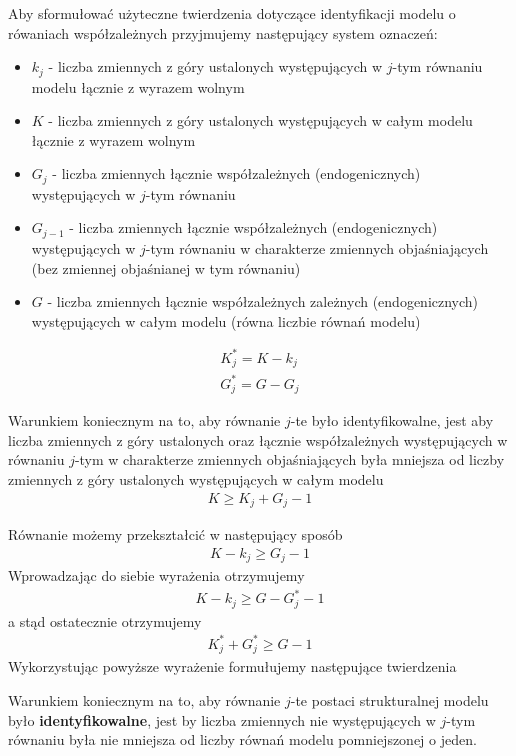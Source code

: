Aby sformułować użyteczne twierdzenia dotyczące identyfikacji modelu o rówaniach współzależnych przyjmujemy następujący system oznaczeń:
\begin{itemize}
	\item $ k_j $ - liczba zmiennych z góry ustalonych występujących w $ j $-tym równaniu modelu łącznie z wyrazem wolnym
	\item $ K $ - liczba zmiennych z góry ustalonych występujących w całym modelu łącznie z wyrazem wolnym
	\item $ G_j $ - liczba zmiennych łącznie współzależnych (endogenicznych) występujących w $ j $-tym równaniu
	\item $ G_{j-1} $ - liczba zmiennych łącznie współzależnych (endogenicznych) występujących w $ j $-tym równaniu w charakterze zmiennych objaśniających (bez zmiennej objaśnianej w tym równaniu)
	\item $ G $ - liczba zmiennych łącznie współzależnych zależnych (endogenicznych) występujących w całym modelu (równa liczbie równań modelu)
\end{itemize}
\begin{gather*}
K_j^*=K-k_j\\
G_j^*=G-G_j
\end{gather*}
\begin{twr}
	Warunkiem koniecznym na to, aby równanie $ j $-te było identyfikowalne, jest aby liczba zmiennych z góry ustalonych oraz łącznie współzależnych występujących w równaniu $ j $-tym w charakterze zmiennych objaśniających była mniejsza od liczby zmiennych z góry ustalonych występujących w całym modelu
	\begin{gather*}
	K\ge K_j+G_j-1
	\end{gather*}
\end{twr}
Równanie możemy przekształcić w następujący sposób
\begin{gather*}
K-k_j\ge G_j-1
\end{gather*}
Wprowadzając do siebie wyrażenia otrzymujemy
\begin{gather*}
K-k_j\ge G-G_j^*-1
\end{gather*}
a stąd ostatecznie otrzymujemy
\begin{gather*}
K_j^*+G_j^*\ge G-1
\end{gather*}
Wykorzystując powyższe wyrażenie formułujemy następujące twierdzenia
\begin{twr}
	Warunkiem koniecznym na to, aby równanie $ j $-te postaci strukturalnej modelu było \textbf{identyfikowalne}, jest by liczba zmiennych nie występujących w $ j $-tym równaniu była nie mniejsza od liczby równań modelu pomniejszonej o jeden.
\end{twr}

